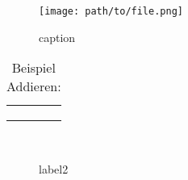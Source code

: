 
\begin{figure}[H]
    \begin{center}
        \texttt{[image: path/to/file.png]}
        \caption{caption}
        \label{fig:A1_label}
    \end{center}
\end{figure}



\begin{table}[ht]
    \centering
    \begin{tabular}{|c|c|c|c|}\hline
    \tbf{}     & \tbf{} & \tbf{} \\ \hline
                       &    &            \\
                 &   &         \\ \hline
                     &  &  \\ \hline
    \end{tabular}
    \caption{Beispiel Addieren:}
\end{table}


\iffalse
\fi

\begin{figure}[h]
\begin{center}
 \\
\caption{label2}
\label{some example}
\end{center}
\end{figure}